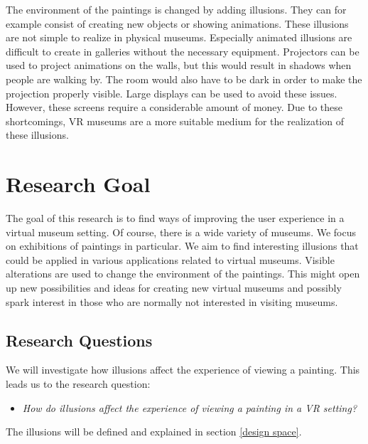 \documentclass[a4paper]{article}
\begin{document}
The environment of the paintings is changed by adding illusions. They can for example consist of creating new objects or showing animations. These illusions are not simple to realize in physical museums. Especially animated illusions are difficult to create in galleries without the necessary equipment. Projectors can be used to project animations on the walls, but this would result in shadows when people are walking by. The room would also have to be dark in order to make the projection properly visible. Large displays can be used to avoid these issues. However, these screens require a considerable amount of money. Due to these shortcomings, VR museums are a more suitable medium for the realization of these illusions. 

\section{Research Goal}
The goal of this research is to find ways of improving the user experience in a virtual museum setting. Of course, there is a wide variety of museums. We focus on exhibitions of paintings in particular. We aim to find interesting illusions that could be applied in various applications related to virtual museums. Visible alterations are used to change the environment of the paintings. This might open up new possibilities and ideas for creating new virtual museums and possibly spark interest in those who are normally not interested in visiting museums.

\subsection {Research Questions}


We will investigate how illusions affect the experience of viewing a painting. This leads us to the research question:
\begin{itemize}
\item{\emph{How do illusions affect the experience of viewing a painting in a VR setting?}}
\end{itemize}
The illusions will be defined and explained in section \ref{design space}. 
\end{document}
